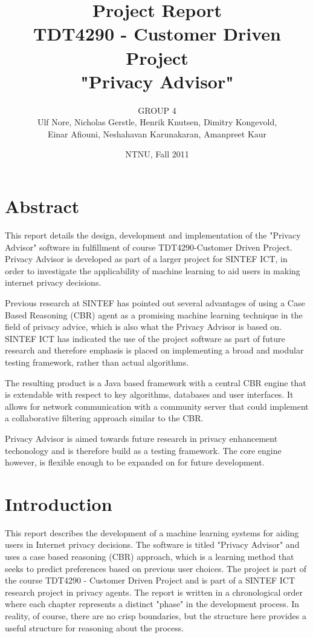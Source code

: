 \documentclass[11pt]{book}
\title{Project Report\\
TDT4290 - Customer Driven Project \\ 
"Privacy Advisor"}
\author{GROUP 4\\
Ulf Nore, Nicholas Gerstle, Henrik Knutsen, Dimitry Kongevold,\\ 
Einar Afiouni, Neshahavan Karunakaran, Amanpreet Kaur}
\date{NTNU, Fall 2011}
\begin{document}
\dominitoc 

\frontmatter
\maketitle

\chapter*{\centering Abstract}
This report details the design, development and implementation of the
"Privacy Advisor" software in fulfillment of course TDT4290-Customer
Driven Project. Privacy Advisor is developed as part of a larger project for SINTEF ICT, in
order to investigate the applicability of machine learning to aid users in
making internet privacy decisions. 

Previous research at SINTEF has pointed
out several advantages of using a Case Based Reasoning (CBR) agent as
a promising machine learning technique in the field of privacy advice,
which is also what the Privacy Advisor is based on. SINTEF ICT
has indicated the use of the project software as part of future
research and therefore emphasis is placed on implementing a broad
and modular testing framework, rather than actual algorithms.

The resulting product is a Java based framework with a central CBR
engine that is extendable with respect to key algorithms, databases
and user interfaces. It allows for network communication with a
community server that could implement a collaborative filtering approach 
similar to the CBR.

Privacy Advisor is aimed towards future research in privacy
enhancement techonology and is therefore build as a testing
framework. The core engine however, is flexible enough to be expanded
on for future development.





\listoftables

\listoffigures

\tableofcontents \label{toc}



\chapter{Introduction}

This report describes the development of a machine learning systems for aiding users in Internet privacy decisions. The software is titled "Privacy Advisor" and uses a case based reasoning (CBR) approach, which is a learning method that seeks to predict preferences based on previous user choices. The project is part of the course TDT4290 - Customer Driven Project and is part of a SINTEF ICT research project in privacy agents. The report is written in a chronological order where each chapter represents a distinct "phase" in the development process. In reality, of course, there are no crisp boundaries, but the structure here provides a useful structure for reasoning about the process. 
\end{document}
